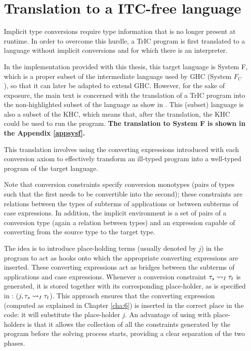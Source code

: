 \section{Translation to a ITC-free language}
\label{5.5}
Implicit type conversions require type information that is no longer present at runtime. In order to overcome this hurdle, a TrIC program is first translated to a language without implicit conversions and for which there is an interpreter.

In the implementation provided with this thesis, this target language is System F, which is a proper subset of the intermediate language used by GHC (System $F_C$ \cite{fc}), so that it can later be adapted to extend GHC. However, for the sake of exposure, the main text is concerned with the translation of a TrIC program into the non-highlighted subset of the language as show in . This (subset) language is also a subset of the KHC, which means that, after the translation, the KHC could be used to run the program. \textbf{The translation to System F is shown in the Appendix \ref{appsysf}.}


This translation involves using the converting expressions introduced with each conversion axiom to effectively transform an ill-typed program into a well-typed program of the target language.

Note that conversion constraints specify conversion monotypes (pairs of types such that the first needs to be convertible into the second); these constraints are relations between the types of subterms of applications or between subterms of case expressions. In addition, the implicit environment is a set of pairs of a conversion type (again a relation between types) and an expression capable of converting from the source type to the target type.

The idea is to introduce place-holding terms (usually denoted by $j$) in the program to act as hooks onto which the appropriate converting expressions are inserted. These converting expressions act as bridges between the subterms of applications and case expressions. Whenever a conversion constraint ${\mathit{\tau}_s} \rightsquigarrow_{I} {\mathit{\tau}_t}$ is generated, it is stored together with its corresponding place-holder, as is specified in : ($j,{\mathit{\tau}_s} \rightsquigarrow_{I} {\mathit{\tau}_t}$). This approach ensures that the converting expression (computed as explained in Chapter \ref{cha:6}) is inserted in the correct place in the code: it will substitute the place-holder $j$. An advantage of using  with place-holders is that it allows the collection of all the constraints generated by the program before the solving process starts, providing a clear separation of the two phases.


